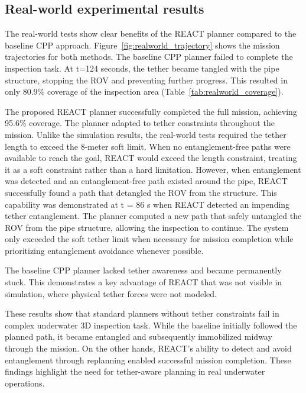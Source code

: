 \subsection{Real-world  experimental results}

The real-world tests show clear benefits of the \ac{REACT} planner compared to the baseline \ac{CPP} approach. Figure~\ref{fig:realworld_trajectory} shows the mission trajectories for both methods.
The baseline \ac{CPP} planner failed to complete the inspection task. At t=124 seconds, the tether became tangled with the pipe structure, stopping the \ac{ROV} and preventing further progress. This resulted in only 80.9\% coverage of the inspection area (Table~\ref{tab:realworld_coverage}).

The proposed \ac{REACT} planner successfully completed the full mission, achieving 95.6\% coverage. The planner adapted to tether constraints throughout the mission. Unlike the simulation results, the real-world tests required the tether length to exceed the 8-meter soft limit. When no entanglement-free paths were available to reach the goal, \ac{REACT} would exceed the length constraint, treating it as a soft constraint rather than a hard limitation. However, when entanglement was detected and an entanglement-free path existed around the pipe, \ac{REACT} successfully found a path that detangled the \ac{ROV} from the structure. This capability was demonstrated at t = 86 s when \ac{REACT} detected an impending tether entanglement. The planner computed a new path that safely untangled the \ac{ROV} from the pipe structure, allowing the inspection to continue. The system only exceeded the soft tether limit when necessary for mission completion while prioritizing entanglement avoidance whenever possible.

The baseline \ac{CPP} planner lacked tether awareness and became permanently stuck. This demonstrates a key advantage of \ac{REACT} that was not visible in simulation, where physical tether forces were not modeled.

These results show that standard planners without tether constraints fail in complex underwater 3D inspection task. While the baseline initially followed the planned path, it became entangled and subsequently immobilized midway through the mission. On the other hands, \ac{REACT}'s ability to detect and avoid entanglement through replanning enabled successful mission completion. These findings highlight the need for tether-aware planning in real underwater operations.




